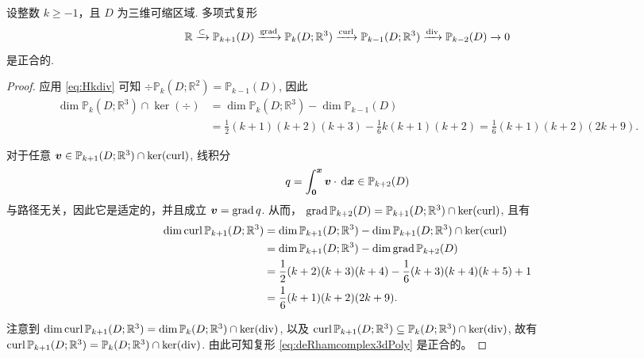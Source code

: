 \begin{lemma}
设整数 $k\geq-1$，且 $D$ 为三维可缩区域.
多项式复形
\begin{equation}\label{eq:deRhamcomplex3dPoly}
\mathbb R\xrightarrow{\subset} \mathbb P_{k+1}(D)\xrightarrow{\operatorname{grad}} \mathbb P_{k}(D;\mathbb R^3)\xrightarrow{\operatorname{curl}}\mathbb P_{k-1}(D;\mathbb R^3) \xrightarrow{\operatorname{div}} \mathbb P_{k-2}(D)\xrightarrow{}0
\end{equation}
是正合的.  
\end{lemma}
\begin{proof}
应用 \eqref{eq:Hkdiv} 可知 $\div\mathbb P_k(D;\mathbb R^2) = \mathbb P_{k-1}(D)$, 因此
\begin{align*}
\dim\mathbb P_k(D;\mathbb R^3)\cap\ker(\div)&=\dim \mathbb P_k(D; \mathbb R^3)-\dim \mathbb P_{k-1}(D) \\
&=\frac{1}{2}(k+1)(k+2)(k+3)-\frac{1}{6}k(k+1)(k+2)=\frac{1}{6}(k+1)(k+2)(2k+9).
\end{align*}

对于任意 $\boldsymbol v\in\mathbb P_{k+1}(D; \mathbb R^3)\cap\ker(\operatorname{curl})$, 线积分
\[
q=\int_{\boldsymbol 0}^{\boldsymbol x}\boldsymbol v\cdot\,{\rm d}\boldsymbol x \in \mathbb P_{k+2}(D)
\]
与路径无关，因此它是适定的，并且成立 $\boldsymbol v=\operatorname{grad} q$. 从而， $\operatorname{grad}\mathbb P_{k+2}(D)=\mathbb P_{k+1}(D; \mathbb R^3)\cap\ker(\operatorname{curl})$, 且有
\begin{align*}
\dim\operatorname{curl}\mathbb P_{k+1}(D; \mathbb R^3)&=\dim \mathbb P_{k+1}(D; \mathbb R^3)-\dim \mathbb P_{k+1}(D; \mathbb R^3)\cap\ker(\operatorname{curl}) \\
&=\dim \mathbb P_{k+1}(D; \mathbb R^3)-\dim\operatorname{grad}\mathbb P_{k+2}(D) \\
&=\frac{1}{2}(k+2)(k+3)(k+4)-\frac{1}{6}(k+3)(k+4)(k+5)+1 \\
&=\frac{1}{6}(k+1)(k+2)(2k+9).
\end{align*}

注意到 $\dim\operatorname{curl}\mathbb P_{k+1}(D; \mathbb R^3)=\dim\mathbb P_k(D;\mathbb R^3)\cap\ker(\operatorname{div})$, 以及 $\operatorname{curl}\mathbb P_{k+1}(D; \mathbb R^3)\subseteq\mathbb P_k(D;\mathbb R^3)\cap\ker(\operatorname{div})$, 故有 $\operatorname{curl}\mathbb P_{k+1}(D; \mathbb R^3)=\mathbb P_k(D;\mathbb R^3)\cap\ker(\operatorname{div})$.
由此可知复形 \eqref{eq:deRhamcomplex3dPoly} 是正合的。
\end{proof}

%



